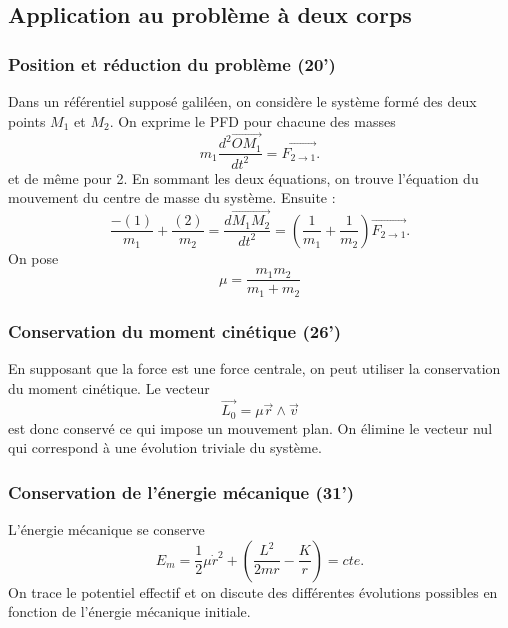 \subsection{Application au problème à deux corps}

\subsubsection{Position et réduction du problème (20')}

Dans un référentiel {} supposé galiléen, on considère le système formé des deux points $M_1$ et $M_2$.
On exprime le PFD pour chacune des masses
\begin{equation}
m_1\frac{d^2\overrightarrow{OM_1}}{dt^2} = \overrightarrow{F_{2\rightarrow 1}}.
\end{equation}
et de même pour 2.
En sommant les deux équations, on trouve l'équation du mouvement du centre de masse du système.
Ensuite :
\begin{equation}
\frac{-(1)}{m_1}+\frac{(2)}{m_2} = \frac{d\overrightarrow{M_1M_2}}{dt^2} = \left( \frac{1}{m_1} + \frac{1}{m_2} \right) \overrightarrow{F_{2\rightarrow 1}}.
\end{equation}
On pose
\begin{equation}
\mu = \frac{m_1m_2}{m_1+m_2}
\end{equation}

\subsubsection{Conservation du moment cinétique (26')}

En supposant que la force est une force centrale, on peut utiliser la conservation du moment cinétique.
Le vecteur 
\begin{equation}
\overrightarrow{L_0} = \mu \overrightarrow{r} \wedge \overrightarrow{v}
\end{equation}
est donc conservé ce qui impose un mouvement plan.
On élimine le vecteur nul qui correspond à une évolution triviale du système.

\subsubsection{Conservation de l'énergie mécanique (31')}

L'énergie mécanique se conserve
\begin{equation}
E_m = \frac{1}{2} \mu \dot{r}^2 + \left(\frac{L^2}{2mr} - \frac{K}{r}\right) = cte.
\end{equation}
On trace le potentiel effectif et on discute des différentes évolutions possibles en fonction de l'énergie mécanique initiale.
